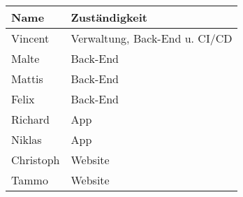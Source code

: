 \begin{tabular}{ll}
 \rowcolor[HTML]{E7E7E7} 
 \textbf{Name} & \textbf{Zuständigkeit} \\ \hline
 Vincent & Verwaltung, Back-End u. CI/CD \\ 
 \rowcolor[HTML]{E7E7E7} 
 Malte & Back-End \\ 
 Mattis & Back-End \\ 
 \rowcolor[HTML]{E7E7E7}
 Felix & Back-End\\ 
 Richard & App\\ 
 \rowcolor[HTML]{E7E7E7}
 Niklas &  App \\ 
 Christoph & Website \\ 
 \rowcolor[HTML]{E7E7E7}
 Tammo & Website \\ 
\end{tabular}

\bigskip
